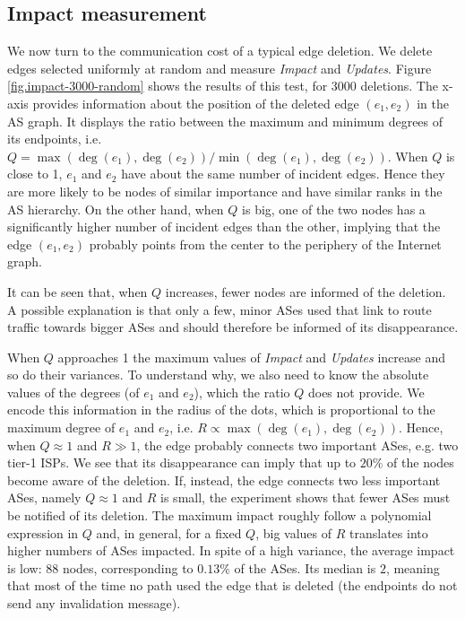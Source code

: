 \documentclass[a4paper,11pt,oneside]{report}
\begin{document}
\subsection{Impact measurement}
\label{sub.impact-measurement}
We now turn to the communication cost of a typical edge deletion. We delete edges selected uniformly at random and measure \textit{Impact} and \textit{Updates}. Figure \ref{fig.impact-3000-random} shows the results of this test, for 3000 deletions. The x-axis provides information about the position of the deleted edge $(e_1, e_2)$ in the AS graph. It displays the ratio between the maximum and minimum degrees of its endpoints, i.e. $Q = \max(\deg(e_1), \deg(e_2))/\min(\deg(e_1), \deg(e_2))$. When $Q$ is close to 1, $e_1$ and $e_2$ have about the same number of incident edges. Hence they are more likely to be nodes of similar importance and have similar ranks in the AS hierarchy. On the other hand, when $Q$ is big, one of the two nodes has a significantly higher number of incident edges than the other, implying that the edge $(e_1, e_2)$ probably points from the center to the periphery of the Internet graph.

It can be seen that, when $Q$ increases, fewer nodes are informed of the deletion. A possible explanation is that only a few, minor ASes used that link to route traffic towards bigger ASes and should therefore be informed of its disappearance.

When $Q$ approaches 1 the maximum values of \textit{Impact} and \textit{Updates} increase and so do their variances. To understand why, we also need to know the absolute values of the degrees (of $e_1$ and $e_2$), which the ratio $Q$ does not provide. We encode this information in the radius of the dots, which is proportional to the maximum degree of $e_1$ and $e_2$, i.e. $R \propto \max(\deg(e_1), \deg(e_2))$.
Hence, when $Q \approx 1$ and $R \gg 1$, the edge probably connects two important ASes, e.g. two tier-1 ISPs. We see that its disappearance can imply that up to $20\%$ of the nodes become aware of the deletion. If, instead, the edge connects two less important ASes, namely $Q \approx 1$ and $R$ is small, the experiment shows that fewer ASes must be notified of its deletion. The maximum impact roughly follow a polynomial expression in $Q$ and, in general, for a fixed $Q$, big values of $R$ translates into higher numbers of ASes impacted.
In spite of a high variance, the average impact is low: $88$ nodes, corresponding to $0.13\%$ of the ASes. Its median is $2$, meaning that most of the time no path used the edge that is deleted (the endpoints do not send any invalidation message).
\end{document}
